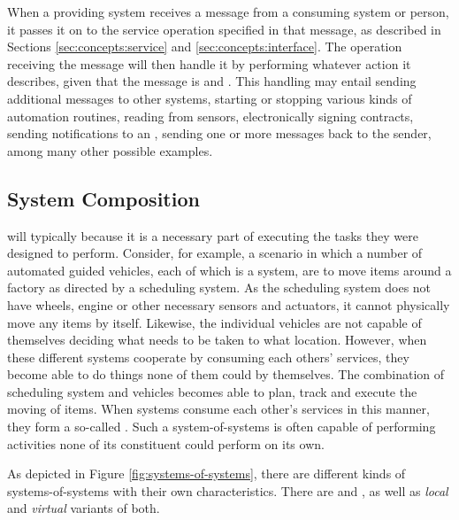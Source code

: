 When a providing system receives a message from a consuming system or person, it passes it on to the service operation specified in that message, as described in Sections \ref{sec:concepts:service} and \ref{sec:concepts:interface}.
The operation receiving the message will then handle it by performing whatever action it describes, given that the message is  and .
This handling may entail sending additional messages to other systems, starting or stopping various kinds of automation routines, reading from sensors, electronically signing contracts, sending notifications to an , sending one or more messages back to the sender, among many other possible examples.

\subsection{System Composition}
\label{sec:overview:system-composition}

 will typically  because it is a necessary part of executing the tasks they were designed to perform.
Consider, for example, a scenario in which a number of automated guided vehicles, each of which is a system, are to move items around a factory as directed by a scheduling system.
As the scheduling system does not have wheels, engine or other necessary sensors and actuators, it cannot physically move any items by itself. 
Likewise, the individual vehicles are not capable of themselves deciding what needs to be taken to what location.
However, when these different systems cooperate by consuming each others' services, they become able to do things none of them could by themselves.
The combination of scheduling system and vehicles becomes able to plan, track and execute the moving of items.
When systems consume each other's services in this manner, they form a so-called .
Such a system-of-systems is often capable of performing activities none of its constituent  could perform on its own.

As depicted in Figure \ref{fig:systems-of-systems}, there are different kinds of systems-of-systems with their own characteristics.
There are  and , as well as \textit{local} and \textit{virtual} variants of both.


